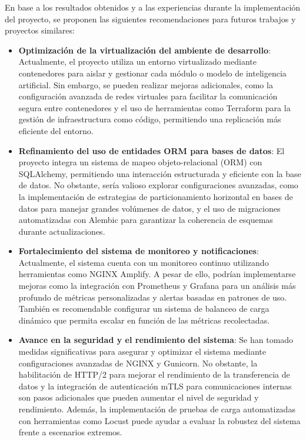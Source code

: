 En base a los resultados obtenidos y a las experiencias durante la implementación del proyecto, se proponen las siguientes recomendaciones para futuros trabajos y proyectos similares:

\begin{itemize}[leftmargin=*,labelsep=5mm]
    \item \textbf{Optimización de la virtualización del ambiente de desarrollo}: Actualmente, el proyecto utiliza un entorno virtualizado mediante contenedores para aislar y gestionar cada módulo o modelo de inteligencia artificial. Sin embargo, se pueden realizar mejoras adicionales, como la configuración avanzada de redes virtuales para facilitar la comunicación segura entre contenedores y el uso de herramientas como Terraform para la gestión de infraestructura como código, permitiendo una replicación más eficiente del entorno.

    \item \textbf{Refinamiento del uso de entidades ORM para bases de datos}: El proyecto integra un sistema de mapeo objeto-relacional (ORM) con SQLAlchemy, permitiendo una interacción estructurada y eficiente con la base de datos. No obstante, sería valioso explorar configuraciones avanzadas, como la implementación de estrategias de particionamiento horizontal en bases de datos para manejar grandes volúmenes de datos, y el uso de migraciones automatizadas con Alembic para garantizar la coherencia de esquemas durante actualizaciones.

    \item \textbf{Fortalecimiento del sistema de monitoreo y notificaciones}: Actualmente, el sistema cuenta con un monitoreo continuo utilizando herramientas como NGINX Amplify. A pesar de ello, podrían implementarse mejoras como la integración con Prometheus y Grafana para un análisis más profundo de métricas personalizadas y alertas basadas en patrones de uso. También es recomendable configurar un sistema de balanceo de carga dinámico que permita escalar en función de las métricas recolectadas.

    \item \textbf{Avance en la seguridad y el rendimiento del sistema}: Se han tomado medidas significativas para asegurar y optimizar el sistema mediante configuraciones avanzadas de NGINX y Gunicorn. No obstante, la habilitación de HTTP/2 para mejorar el rendimiento de la transferencia de datos y la integración de autenticación mTLS para comunicaciones internas son pasos adicionales que pueden aumentar el nivel de seguridad y rendimiento. Además, la implementación de pruebas de carga automatizadas con herramientas como Locust puede ayudar a evaluar la robustez del sistema frente a escenarios extremos.


\end{itemize}
